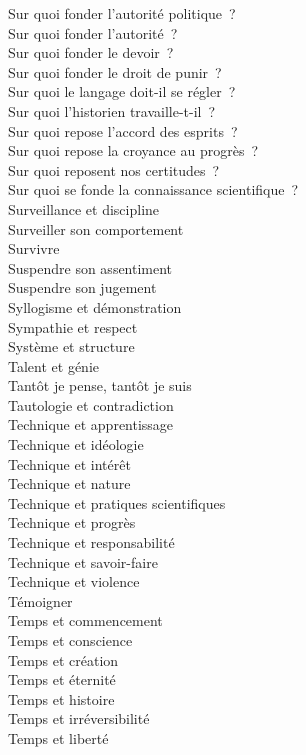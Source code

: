 \documentclass[a4paper,12pt]{article}
\begin{document}
Sur quoi fonder l'autorité politique ? \\
Sur quoi fonder l'autorité ? \\
Sur quoi fonder le devoir ? \\
Sur quoi fonder le droit de punir ? \\
Sur quoi le langage doit-il se régler ? \\
Sur quoi l'historien travaille-t-il ? \\
Sur quoi repose l'accord des esprits ? \\
Sur quoi repose la croyance au progrès ? \\
Sur quoi reposent nos certitudes ? \\
Sur quoi se fonde la connaissance scientifique ? \\
Surveillance et discipline \\
Surveiller son comportement \\
Survivre \\
Suspendre son assentiment \\
Suspendre son jugement \\
Syllogisme et démonstration \\
Sympathie et respect \\
Système et structure \\
Talent et génie \\
Tantôt je pense, tantôt je suis \\
Tautologie et contradiction \\
Technique et apprentissage \\
Technique et idéologie \\
Technique et intérêt \\
Technique et nature \\
Technique et pratiques scientifiques \\
Technique et progrès \\
Technique et responsabilité \\
Technique et savoir-faire \\
Technique et violence \\
Témoigner \\
Temps et commencement \\
Temps et conscience \\
Temps et création \\
Temps et éternité \\
Temps et histoire \\
Temps et irréversibilité \\
Temps et liberté \\
\end{document}

